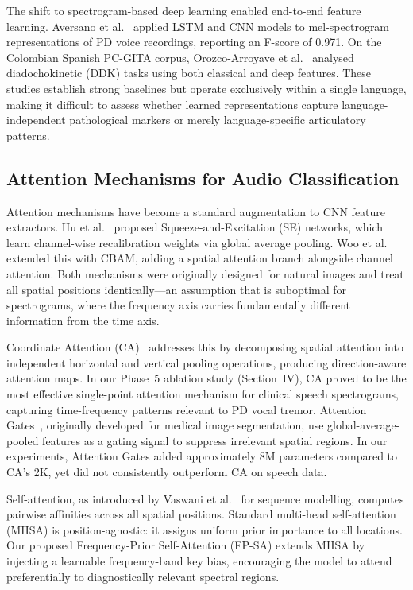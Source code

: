 \documentclass[conference]{IEEEtran}
\begin{document}
The shift to spectrogram-based deep learning enabled end-to-end feature learning. Aversano et al.~\cite{aversano2024} applied LSTM and CNN models to mel-spectrogram representations of PD voice recordings, reporting an F-score of 0.971. On the Colombian Spanish PC-GITA corpus, Orozco-Arroyave et al.~\cite{orozco2014,orozco2016} analysed diadochokinetic (DDK) tasks using both classical and deep features. These studies establish strong baselines but operate exclusively within a single language, making it difficult to assess whether learned representations capture language-independent pathological markers or merely language-specific articulatory patterns.

\subsection{Attention Mechanisms for Audio Classification}

Attention mechanisms have become a standard augmentation to CNN feature extractors. Hu et al.~\cite{hu2018} proposed Squeeze-and-Excitation (SE) networks, which learn channel-wise recalibration weights via global average pooling. Woo et al.~\cite{woo2018} extended this with CBAM, adding a spatial attention branch alongside channel attention. Both mechanisms were originally designed for natural images and treat all spatial positions identically---an assumption that is suboptimal for spectrograms, where the frequency axis carries fundamentally different information from the time axis.

Coordinate Attention (CA)~\cite{hou2021} addresses this by decomposing spatial attention into independent horizontal and vertical pooling operations, producing direction-aware attention maps. In our Phase~5 ablation study (Section~IV), CA proved to be the most effective single-point attention mechanism for clinical speech spectrograms, capturing time-frequency patterns relevant to PD vocal tremor. Attention Gates~\cite{schlemper2019}, originally developed for medical image segmentation, use global-average-pooled features as a gating signal to suppress irrelevant spatial regions. In our experiments, Attention Gates added approximately 8M parameters compared to CA's 2K, yet did not consistently outperform CA on speech data.

Self-attention, as introduced by Vaswani et al.~\cite{vaswani2017} for sequence modelling, computes pairwise affinities across all spatial positions. Standard multi-head self-attention (MHSA) is position-agnostic: it assigns uniform prior importance to all locations. Our proposed Frequency-Prior Self-Attention (FP-SA) extends MHSA by injecting a learnable frequency-band key bias, encouraging the model to attend preferentially to diagnostically relevant spectral regions.
\end{document}
